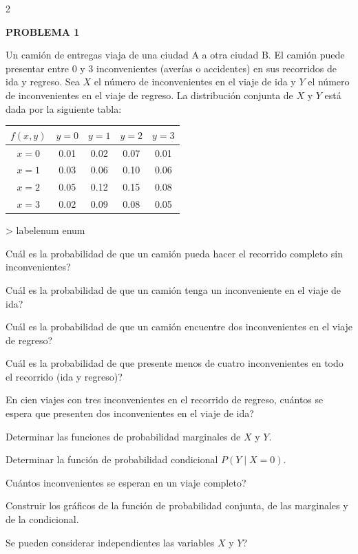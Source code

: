 \documentclass[11pt,letterpaper]{article}
\makeatletter
\renewenvironment{enumerate}
  {\ifnum \@enumdepth >\thr@@\@toodeep\else
   \advance\@enumdepth\@ne
   \edef\@enumctr{enum\romannumeral\the\@enumdepth}%
   \expandafter\list\csname label\@enumctr\endcsname
     {\usecounter\@enumctr
      \setlength{\topsep}{3pt}%
      \setlength{\itemsep}{2pt}%
      \setlength{\parsep}{0pt}%
      \setlength{\partopsep}{0pt}%
      \setlength{\leftmargin}{1.6em}%
      \setlength{\labelsep}{0.4em}}%
   \fi}
  {\endlist}
\newcommand{\problema}[1]{%
  \vspace{2pt}
  \noindent\textbf{\large PROBLEMA #1}\par
  \vspace{2pt}
}
\makeatother
\begin{document}
\pagestyle{empty}

\begin{multicols}{2}
\raggedcolumns

\problema{1}

Un camión de entregas viaja de una ciudad A a otra ciudad B. El camión puede
presentar entre 0 y 3 inconvenientes (averías o accidentes) en sus recorridos
de ida y regreso. Sea \(X\) el número de inconvenientes en el viaje de ida y
\(Y\) el número de inconvenientes en el viaje de regreso. La distribución
conjunta de \(X\) y \(Y\) está dada por la siguiente tabla:

\begin{center}
\small
\setlength{\tabcolsep}{5pt}
\begin{tabular}{c|cccc}
\toprule
\(f(x,y)\) & \(y=0\) & \(y=1\) & \(y=2\) & \(y=3\) \\
\midrule
\(x=0\) & 0.01 & 0.02 & 0.07 & 0.01 \\
\(x=1\) & 0.03 & 0.06 & 0.10 & 0.06 \\
\(x=2\) & 0.05 & 0.12 & 0.15 & 0.08 \\
\(x=3\) & 0.02 & 0.09 & 0.08 & 0.05 \\
\bottomrule
\end{tabular}
\end{center}

\begin{enumerate}
\item Cuál es la probabilidad de que un camión pueda hacer el recorrido completo sin inconvenientes?
\item Cuál es la probabilidad de que un camión tenga un inconveniente en el viaje de ida?
\item Cuál es la probabilidad de que un camión encuentre dos inconvenientes en el viaje de regreso?
\item Cuál es la probabilidad de que presente menos de cuatro inconvenientes en todo el recorrido (ida y regreso)?
\item En cien viajes con tres inconvenientes en el recorrido de regreso, cuántos se espera que presenten dos inconvenientes en el viaje de ida?
\item Determinar las funciones de probabilidad marginales de \(X\) y \(Y\).
\item Determinar la función de probabilidad condicional \(P(Y\mid X=0)\).
\item Cuántos inconvenientes se esperan en un viaje completo?
\item Construir los gráficos de la función de probabilidad conjunta, de las marginales y de la condicional.
\item Se pueden considerar independientes las variables \(X\) y \(Y\)?
\end{enumerate}


\end{multicols}
\end{document}
